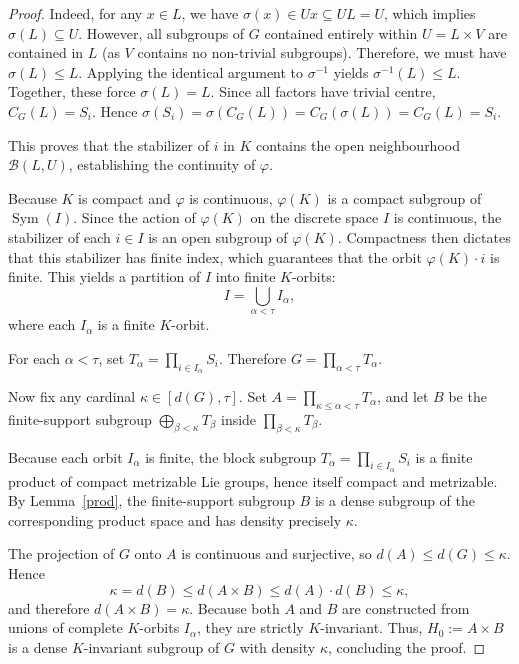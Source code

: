 \documentclass[12pt]{amsart}
\theoremstyle{definition}
\numberwithin{equation}{section}
\theoremstyle{remark}
\def\Sym{\operatorname{Sym}}
\begin{document}
\begin{proof}
Indeed, for any $x \in L$, we have $\sigma(x) \in Ux \subseteq UL = U$, which implies $\sigma(L) \subseteq U$. 
However, all subgroups of $G$ contained entirely within $U = L \times V$ are contained in $L$ (as $V$ contains no non-trivial subgroups). Therefore, we must have $\sigma(L) \leq L$. 
Applying the identical argument to $\sigma^{-1}$ yields $\sigma^{-1}(L) \leq L$. Together, these force $\sigma(L)=L$. Since all factors have trivial centre, $C_G(L)=S_i$. Hence
$\sigma(S_i)=\sigma(C_G(L))=C_G(\sigma(L))=C_G(L)=S_i$.

This proves that the stabilizer of $i$ in $K$ contains the open neighbourhood $\mathcal{B}(L, U)$, establishing the continuity of $\varphi$.

Because $K$ is compact and $\varphi$ is continuous, $\varphi(K)$ is a compact subgroup of $\Sym(I)$. 
Since the action of $\varphi(K)$ on the discrete space $I$ is continuous, the stabilizer of each $i \in I$ is an open subgroup of $\varphi(K)$. Compactness then dictates that this stabilizer has finite index, which guarantees that the orbit $\varphi(K) \cdot i$ is finite. This yields a partition of $I$ into finite $K$-orbits:
\[
I = \bigcup_{\alpha < \tau} I_\alpha,
\]
where each $I_\alpha$ is a finite $K$-orbit.

For each $\alpha<\tau$, set $T_\alpha=\prod_{i\in I_\alpha}S_i$. Therefore $G=\prod_{\alpha<\tau}T_\alpha$.

Now fix any cardinal $\kappa \in [d(G), \tau]$. Set
$A=\prod_{\kappa\leq\alpha<\tau}T_\alpha$, and let $B$ be the finite-support subgroup $\bigoplus_{\beta<\kappa}T_\beta$ inside $\prod_{\beta<\kappa}T_\beta$.

Because each orbit $I_\alpha$ is finite, the block subgroup $T_\alpha = \prod_{i \in I_\alpha} S_i$ is a finite product of compact metrizable Lie groups, hence itself compact and metrizable. By Lemma~\ref{prod}, the finite-support subgroup $B$ is a dense subgroup of the corresponding product space and has density precisely $\kappa$.

The projection of $G$ onto $A$ is continuous and surjective, so $d(A)\leq d(G)\leq\kappa$. Hence
\[
\kappa=d(B)\leq d(A\times B)\leq d(A)\cdot d(B)\leq\kappa,
\]
and therefore $d(A\times B)=\kappa$.
Because both $A$ and $B$ are constructed from unions of complete $K$-orbits $I_\alpha$, they are strictly $K$-invariant. Thus, $H_0 := A \times B$ is a dense $K$-invariant subgroup of $G$ with density $\kappa$, concluding the proof.
\end{proof}
\end{document}
